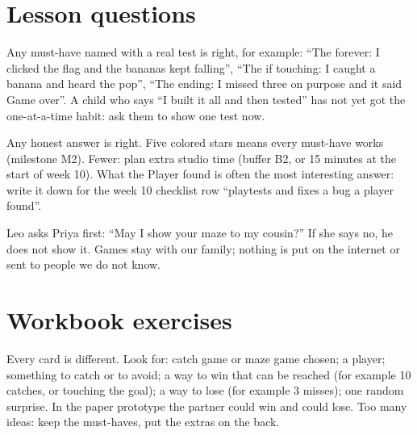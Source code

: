 
\section{Lesson questions}
\begin{answer}
Any must-have named with a real test is right, for example: \enquote{The forever: I clicked the flag and the bananas kept falling}, \enquote{The if touching: I caught a banana and heard the pop}, \enquote{The ending: I missed three on purpose and it said Game over}. A child who says \enquote{I built it all and then tested} has not yet got the one-at-a-time habit: ask them to show one test now.
\end{answer}

\begin{answer}[Reflection]
Any honest answer is right. Five colored stars means every must-have works (milestone M2). Fewer: plan extra studio time (buffer B2, or 15 minutes at the start of week 10). What the Player found is often the most interesting answer: write it down for the week 10 checklist row \enquote{playtests and fixes a bug a player found}.
\end{answer}

\begin{answer}
Leo asks Priya first: \enquote{May I show your maze to my cousin?} If she says no, he does not show it. Games stay with our family; nothing is put on the internet or sent to people we do not know.
\end{answer}

\section{Workbook exercises}
\begin{answer}
Every card is different. Look for: catch game or maze game chosen; a player; something to catch or to avoid; a way to win that can be reached (for example 10 catches, or touching the goal); a way to lose (for example 3 misses); one random surprise. In the paper prototype the partner could win and could lose. Too many ideas: keep the must-haves, put the extras on the back.
\end{answer}

